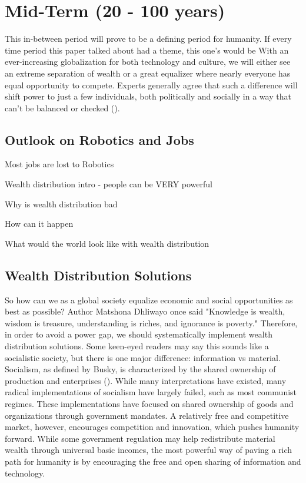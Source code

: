 \section{Mid-Term (20 - 100 years)}
\label{sec:mid}
This in-between period will prove to be a defining period for humanity. If every time period this paper talked about had a theme, this one's would be %
With an ever-increasing globalization for both technology and culture, we will either see an extreme separation of wealth or a great equalizer where nearly everyone has equal opportunity to compete. Experts generally agree that such a difference will shift power to just a few individuals, both politically and socially in a way that can't be balanced or checked (\cite{WhatsWrongWithWealthDistribution}).

\subsection{Outlook on Robotics and Jobs}

Most jobs are lost to Robotics

Wealth distribution intro - people can be VERY powerful

Why is wealth distribution bad

How can it happen

What would the world look like with wealth distribution

\subsection{Wealth Distribution Solutions}

So how can we as a global society equalize economic and social opportunities as best as possible? Author Matshona Dhliwayo once said "Knowledge is wealth, wisdom is treasure, understanding is riches, and ignorance is poverty." %
Therefore, in order to avoid a power gap, we should systematically implement wealth distribution solutions. Some keen-eyed readers may say this sounds like a socialistic society, but there is one major difference: information vs material. Socialism, as defined by Busky, is characterized by the shared ownership of production and enterprises (\cite{WhatIsSocialism}). While many interpretations have existed, many radical implementations of socialism have largely failed, such as most communist regimes. These implementations have focused on shared ownership of goods and organizations through government mandates. A relatively free and competitive market, however, encourages competition and innovation, which pushes humanity forward. While some government regulation may help redistribute material wealth through universal basic incomes, the most powerful way of paving a rich path for humanity is by encouraging the free and open sharing of information and technology.


